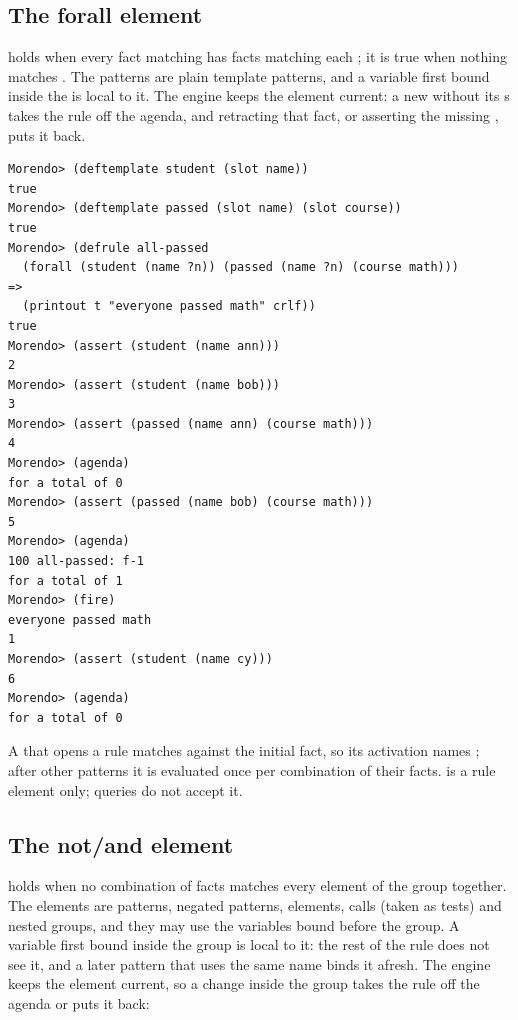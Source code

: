 \subsection{The forall element}
\label{sec:forall}

 holds when every fact matching  has facts
matching each ; it is true when nothing matches . The
patterns are plain template patterns, and a variable first bound inside
the  is local to it. The engine keeps the element current:
a new  without its s takes the rule off the agenda, and
retracting that fact, or asserting the missing , puts it back.

\begin{lstlisting}[style=shell]
Morendo> (deftemplate student (slot name))
true
Morendo> (deftemplate passed (slot name) (slot course))
true
Morendo> (defrule all-passed
  (forall (student (name ?n)) (passed (name ?n) (course math)))
=>
  (printout t "everyone passed math" crlf))
true
Morendo> (assert (student (name ann)))
2
Morendo> (assert (student (name bob)))
3
Morendo> (assert (passed (name ann) (course math)))
4
Morendo> (agenda)
for a total of 0
Morendo> (assert (passed (name bob) (course math)))
5
Morendo> (agenda)
100 all-passed: f-1
for a total of 1
Morendo> (fire)
everyone passed math
1
Morendo> (assert (student (name cy)))
6
Morendo> (agenda)
for a total of 0
\end{lstlisting}

A  that opens a rule matches against the initial fact, so
its activation names ; after other patterns it is evaluated once
per combination of their facts.  is a rule element only;
queries do not accept it.

\subsection{The not/and element}
\label{sec:not-and}

 holds when no combination of facts matches every
element of the group together. The elements are patterns, negated
patterns,  elements, calls (taken as tests) and nested groups,
and they may use the variables bound before the group. A variable first
bound inside the group is local to it: the rest of the rule does not see
it, and a later pattern that uses the same name binds it afresh. The
engine keeps the element current, so a change inside the group takes the
rule off the agenda or puts it back:

